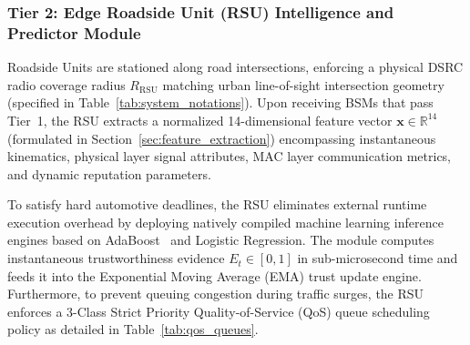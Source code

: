 \documentclass[conference]{IEEEtran}
\begin{document}
\subsubsection{Tier 2: Edge Roadside Unit (RSU) Intelligence and Predictor Module}
Roadside Units are stationed along road intersections, enforcing a physical DSRC radio coverage radius $R_{\text{RSU}}$ matching urban line-of-sight intersection geometry (specified in Table~\ref{tab:system_notations}). Upon receiving BSMs that pass Tier~1, the RSU extracts a normalized 14-dimensional feature vector $\mathbf{x} \in \mathbb{R}^{14}$ (formulated in Section~\ref{sec:feature_extraction}) encompassing instantaneous kinematics, physical layer signal attributes, MAC layer communication metrics, and dynamic reputation parameters. 

To satisfy hard automotive deadlines, the RSU eliminates external runtime execution overhead by deploying natively compiled machine learning inference engines based on AdaBoost~\cite{adaboost, dietterich2000ensemble} and Logistic Regression. The module computes instantaneous trustworthiness evidence $E_t \in [0, 1]$ in sub-microsecond time and feeds it into the Exponential Moving Average (EMA) trust update engine. Furthermore, to prevent queuing congestion during traffic surges, the RSU enforces a 3-Class Strict Priority Quality-of-Service (QoS) queue scheduling policy as detailed in Table~\ref{tab:qos_queues}.

\begin{table}[htbp]
\centering
\caption{Three-Class Strict Priority Quality-of-Service (QoS) Queue Scheduling Policy at Edge Roadside Units}
\label{tab:qos_queues}
\end{table}
\end{document}
